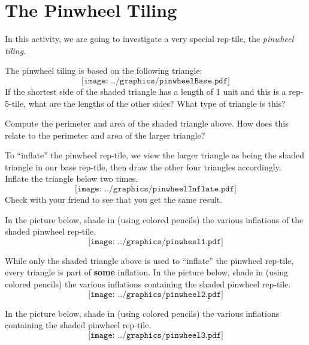 \newpage
\section{The Pinwheel Tiling}

In this activity, we are going to investigate a very special rep-tile,
the \textit{pinwheel tiling}.

\begin{prob}
The pinwheel tiling is based on the following triangle:
\[
\texttt{[image: ../graphics/pinwheelBase.pdf]}
\]
If the shortest side of the shaded triangle has a length of 1 unit and this is a rep-5-tile,
what are the lengths of the other sides? What type of triangle is
this?
\end{prob}

\begin{prob}
Compute the perimeter and area of the shaded triangle above. How does this
relate to the perimeter and area of the larger triangle?
\end{prob}

\begin{prob}
To ``inflate'' the pinwheel rep-tile, we view the larger
triangle as being the shaded triangle in our base rep-tile, then draw the other four triangles accordingly. Inflate the triangle below two times.
\[
\texttt{[image: ../graphics/pinwheelInflate.pdf]}
\]
Check with your friend to see that you get the same result.
\end{prob}




\break

\begin{prob}
In the picture below, shade in (using colored pencils) the various
inflations of the shaded pinwheel rep-tile.
\[
\texttt{[image: ../graphics/pinwheel1.pdf]}
\]
\end{prob}


\begin{prob}
While only the shaded triangle above is used to ``inflate'' the
pinwheel rep-tile, every triangle is part of \textbf{some}
inflation. In the picture below, shade in (using colored pencils) the
various inflations containing the shaded pinwheel rep-tile.
\[
\texttt{[image: ../graphics/pinwheel2.pdf]}
\]
\end{prob}


\break

\begin{prob}
In the picture below, shade in (using colored pencils) the
various inflations containing the shaded pinwheel rep-tile.
\[
\texttt{[image: ../graphics/pinwheel3.pdf]}
\]
\end{prob}

